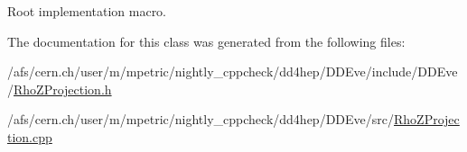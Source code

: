 Root implementation macro. 



The documentation for this class was generated from the following files\+:\begin{DoxyCompactItemize}
\item 
/afs/cern.\+ch/user/m/mpetric/nightly\+\_\+cppcheck/dd4hep/\+D\+D\+Eve/include/\+D\+D\+Eve/\hyperlink{_rho_z_projection_8h}{Rho\+Z\+Projection.\+h}\item 
/afs/cern.\+ch/user/m/mpetric/nightly\+\_\+cppcheck/dd4hep/\+D\+D\+Eve/src/\hyperlink{_rho_z_projection_8cpp}{Rho\+Z\+Projection.\+cpp}\end{DoxyCompactItemize}
